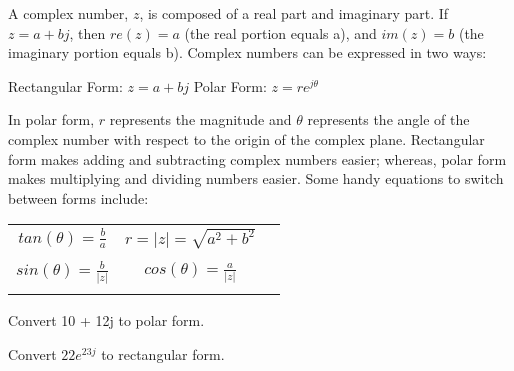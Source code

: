 \documentclass{article}
\begin{document}



A complex number, $z$, is composed of a real part and imaginary part.
If $z = a + bj$, then $re(z) = a$ (the real portion equals a), and $im(z) = b$ (the imaginary portion equals b).
Complex numbers can be expressed in two ways:

\begin{center}
Rectangular Form: $z = a + bj$ \hspace{1em} Polar Form: $z = re^{j\theta}$
\end{center}

In polar form, $r$ represents the magnitude and $\theta$ represents the angle of the complex number with respect to the origin of the complex plane.
Rectangular form makes adding and subtracting complex numbers easier; whereas, polar form makes multiplying and dividing numbers easier.
Some handy equations to switch between forms include:

\begin{center}
\begin{tabular}{ c c c }
 $tan(\theta) = \frac{b}{a}$ & $r = |z| = \sqrt{a^2 + b^2}$ \\ \\
 $sin(\theta) = \frac{b}{|z|}$ & $cos(\theta) = \frac{a}{|z|}$ \\  \\
\end{tabular}
\end{center}

\begin{enumerate}
\qitem Convert 10 + 12j to polar form.
\end{enumerate}

\begin{enumerate}
\qitem Convert $22e^{23j}$ to rectangular form.
\end{enumerate}
\end{document}
